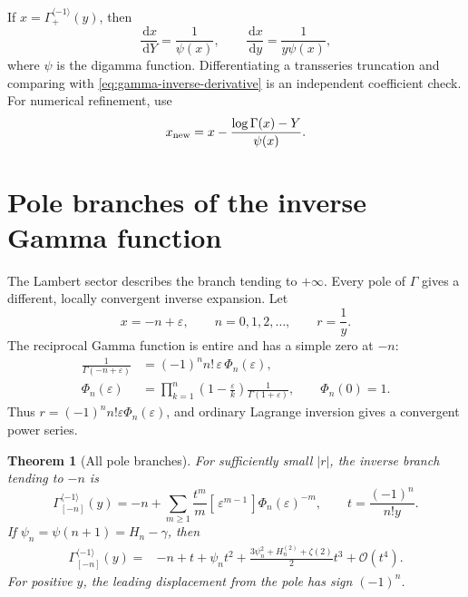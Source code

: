 \documentclass[11pt,a4paper]{article}
\numberwithin{equation}{section}
\newtheorem{theorem}{Theorem}[section]
\theoremstyle{definition}
\theoremstyle{remark}
\newcommand{\dd}{\,\mathrm d}
\newcommand{\Ord}{\mathcal O}
\newcommand{\cinv}{\langle-1\rangle}
\newcommand{\coeff}[2]{[\,#1^{#2}\,]}
\newcommand{\GamInv}{\Gamma_{+}^{\cinv}}
\begin{document}
If \(x=\GamInv(y)\), then
\begin{equation}
 \frac{\dd x}{\dd Y}=\frac1{\psi(x)},
 \qquad
 \frac{\dd x}{\dd y}=\frac1{y\psi(x)},
 \label{eq:gamma-inverse-derivative}
\end{equation}
where \(\psi\) is the digamma function.  Differentiating a transseries
truncation and comparing with \cref{eq:gamma-inverse-derivative} is an
independent coefficient check.  For numerical refinement, use
\begin{equation}
 x_{\rm new}=x-\frac{\log\Gamma(x)-Y}{\psi(x)}.
 \label{eq:gamma-Newton}
\end{equation}

\section{Pole branches of the inverse Gamma function}

The Lambert sector describes the branch tending to \(+\infty\).  Every
pole of \(\Gamma\) gives a different, locally convergent inverse expansion.
Let
\begin{equation}
 x=-n+\varepsilon,
 \qquad n=0,1,2,\ldots,
 \qquad r=\frac1y.
 \label{eq:pole-variables}
\end{equation}
The reciprocal Gamma function is entire and has a simple zero at \(-n\):
\begin{align}
 \frac1{\Gamma(-n+\varepsilon)}
 & =(-1)^n n!\,\varepsilon\,\Phi_n(\varepsilon),
 \label{eq:recip-gamma-pole}\\
 \Phi_n(\varepsilon)
 & =\prod_{k=1}^n\left(1-\frac{\varepsilon}{k}\right)
 \frac1{\Gamma(1+\varepsilon)},
 \qquad \Phi_n(0)=1.
 \label{eq:Phi-n}
\end{align}
Thus \(r=(-1)^nn!\varepsilon\Phi_n(\varepsilon)\), and ordinary Lagrange
inversion gives a convergent power series.

\begin{theorem}[All pole branches]\label{thm:gamma-pole-branches}
For sufficiently small \(|r|\), the inverse branch tending to \(-n\) is
\begin{equation}
 \Gamma_{[-n]}^{\cinv}(y)
 =-n+\sum_{m\ge1}\frac{t^m}{m}
 \coeff{\varepsilon}{m-1}{\Phi_n(\varepsilon)^{-m}},
 \qquad t=\frac{(-1)^n}{n!y}.
 \label{eq:pole-Lagrange}
\end{equation}
If \(\psi_n=\psi(n+1)=H_n-\gamma\), then
\begin{align}
 \Gamma_{[-n]}^{\cinv}(y)={}&-n+t+\psi_n t^2
 +\frac{3\psi_n^2+H_n^{(2)}+\zeta(2)}{2}t^3
 +\Ord(t^4).
 \label{eq:pole-first-terms}
\end{align}
For positive \(y\), the leading displacement from the pole has sign
\((-1)^n\).
\end{theorem}
\end{document}
